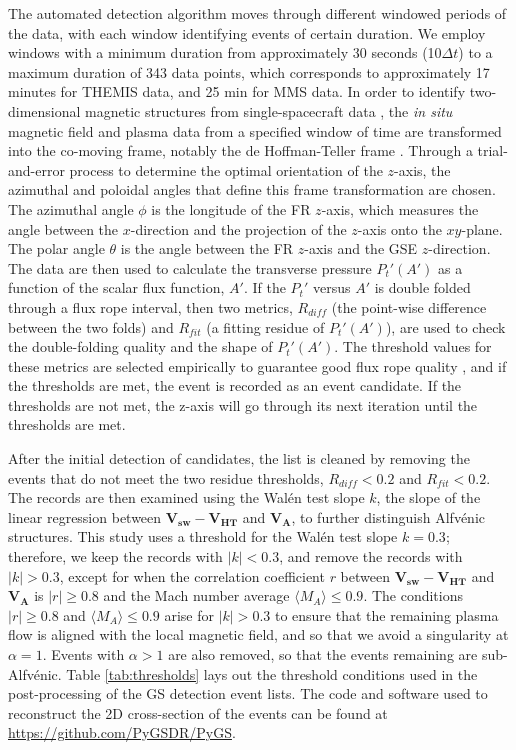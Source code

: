 The automated detection algorithm moves through different windowed periods of the data, with each window identifying events of certain duration. We employ windows with a minimum duration from approximately 30 seconds (10$\Delta t$) to a maximum duration of 343 data points, which corresponds to approximately 17 minutes for THEMIS data, and 25 min for MMS data. In order to identify two-dimensional magnetic structures from single-spacecraft data \citep{Paschmann:2008}, the \textit{in situ} magnetic field and plasma data from a specified window of time are transformed into the co-moving frame, notably the de Hoffman-Teller frame \citep{deHoffman-Teller:1950}. Through a trial-and-error process to determine the optimal orientation of the $z$-axis, the azimuthal and poloidal angles that define this frame transformation are chosen. The azimuthal angle $\phi$ is the longitude of the FR $z$-axis, which measures the angle between the $x$-direction and the projection of the $z$-axis onto the $xy$-plane. The polar angle $\theta$ is the angle between the FR $z$-axis and the GSE $z$-direction. %
The data are then used to calculate the transverse pressure $P_t'(A')$ as a function of the scalar flux function, $A'$. If the $P_t'$ versus $A'$ is double folded through a flux rope interval, then two metrics, $R_{diff}$ (the point-wise difference between the two folds) and $R_{fit}$ (a fitting residue of $P_t'(A')$), are used to check the double-folding quality and the shape of $P_t'(A')$. The threshold values for these metrics are selected empirically to guarantee good flux rope quality \citep{Hu:2018}, and if the thresholds are met, the event is recorded as an event candidate. If the thresholds are not met, the z-axis will go through its next iteration until the thresholds are met.

After the initial detection of candidates, the list is cleaned by removing the events that do not meet the two residue thresholds, $R_{diff}<0.2$ and $R_{fit}<0.2$. The records are then examined using the Wal\'en test slope $k$, the slope of the linear regression between $\mathbf{V_{sw}} - \mathbf{V_{HT}}$ and $\mathbf{V_A}$, to further distinguish Alfv\'enic structures. This study uses a threshold for the Wal\'en test slope $k=0.3$; therefore, we keep the records with $|k|<0.3$, and remove the records with $|k|>0.3$, except for when the correlation coefficient $r$ between $\mathbf{V_{sw}} - \mathbf{V_{HT}}$ and $\mathbf{V_A}$ is $|r|\geq 0.8$ and the Mach number average $\langle M_A\rangle \leq 0.9$. The conditions $|r|\geq 0.8$ and $\langle M_A\rangle \leq 0.9$ arise for $|k|>0.3$ to ensure that the remaining plasma flow is aligned with the local magnetic field, and so that we avoid a singularity at $\alpha=1$. Events with $\alpha>1$ are also removed, so that the events remaining are sub-Alfv\'enic. Table \ref{tab:thresholds} lays out the threshold conditions used in the post-processing of the GS detection event lists. The code and software used to reconstruct the 2D cross-section of the events can be found at \url{https://github.com/PyGSDR/PyGS}.


